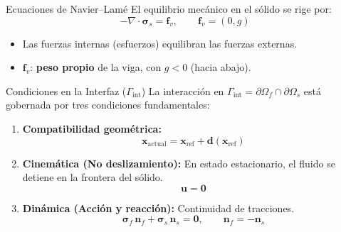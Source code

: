 \begin{frame}{Ecuaciones de Navier--Lamé}
El equilibrio mecánico en el sólido se rige por:
\[
-\nabla \cdot \boldsymbol{\sigma}_s = \mathbf{f}_v,
\qquad
\mathbf{f}_v = (0, g)
\]

\vspace{0.3cm}
\begin{itemize}
    \item Las fuerzas internas (esfuerzos) equilibran las fuerzas externas.
    \item $\mathbf{f}_v$: \textbf{peso propio} de la viga, con $g < 0$ (hacia abajo).
\end{itemize}
\end{frame}


\begin{frame}{Condiciones en la Interfaz ($\Gamma_{\text{int}}$)}
    La interacción en $\Gamma_{\text{int}} = \partial \Omega_f \cap \partial \Omega_s$ está gobernada por tres condiciones fundamentales:
    
    \vspace{0.5cm}
    \begin{enumerate}
        \item \textbf{Compatibilidad geométrica:} 
        \[ \mathbf{x}_{\text{actual}} = \mathbf{x}_{\text{ref}} + \mathbf{d}(\mathbf{x}_{\text{ref}}) \]
        \item \textbf{Cinemática (No deslizamiento):} En estado estacionario, el fluido se detiene en la frontera del sólido.
        \[ \mathbf{u} = \mathbf{0} \]
        \item \textbf{Dinámica (Acción y reacción):} Continuidad de tracciones.
        \[ \boldsymbol{\sigma}_f \, \mathbf{n}_f + \boldsymbol{\sigma}_s \, \mathbf{n}_s = \mathbf{0}, \qquad \mathbf{n}_f = -\mathbf{n}_s \]
    \end{enumerate}
\end{frame}

